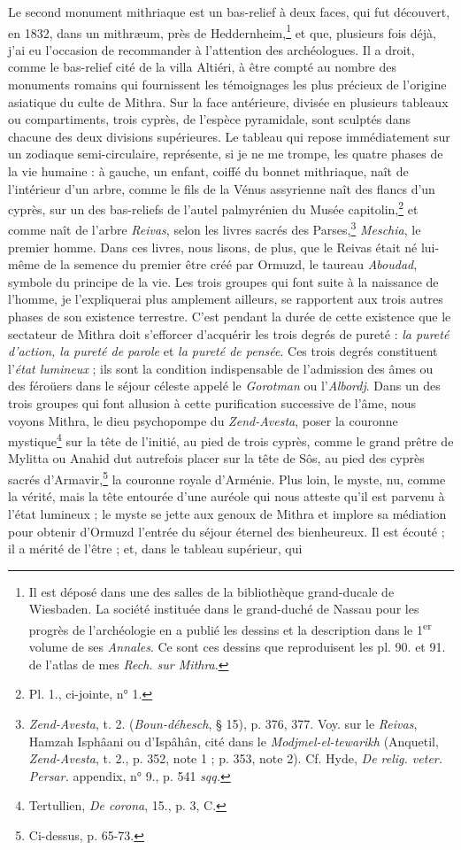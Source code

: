 \documentclass{article}
\begin{document}
Le second monument mithriaque est un bas-relief à deux faces, qui fut découvert, en 1832, dans un mithræum, près de Heddernheim,\footnote{Il est déposé dans une des salles de la bibliothèque grand-ducale de Wiesbaden. La société instituée dans le grand-duché de Nassau pour les progrès de l'archéologie en a publié les dessins et la description dans le 1\textsuperscript{er} volume de ses \emph{Annales}. Ce sont ces dessins que reproduisent les pl. 90. et 91. de l'atlas de mes \emph{Rech. sur Mithra}.} et que, plusieurs fois déjà, j'ai eu l'occasion de recommander à l'attention des archéologues. Il a droit, comme le bas-relief cité de la villa Altiéri, à être compté au nombre des monuments romains qui fournissent les témoignages les plus précieux de l'origine asiatique du culte de Mithra. Sur la face antérieure, divisée en plusieurs tableaux ou compartiments, trois cyprès, de l'espèce pyramidale, sont sculptés dans chacune des deux divisions supérieures. Le tableau qui repose immédiatement sur un zodiaque semi-circulaire, représente, si je ne me trompe, les quatre phases de la vie humaine : à gauche, un enfant, coiffé du bonnet mithriaque, naît de l'intérieur d'un arbre, comme le fils de la Vénus assyrienne naît des flancs d'un cyprès, sur un des bas-reliefs de l'autel palmyrénien du Musée capitolin,\footnote{Pl. 1., ci-jointe, n° 1.} et comme naît de l'arbre \emph{Reivas}, selon les livres sacrés des Parses,\footnote{\emph{Zend-Avesta}, t. 2. (\emph{Boun-déhesch}, § 15), p. 376, 377. Voy. sur le \emph{Reivas}, Hamzah Isphâani ou d'Ispâhân, cité dans le \emph{Modjmel-el-tewarikh} (Anquetil, \emph{Zend-Avesta}, t. 2., p. 352, note 1 ; p. 353, note 2). Cf. Hyde, \emph{De relig. veter. Persar.} appendix, n° 9., p. 541 \emph{sqq.}} \emph{Meschia}, le premier homme. Dans ces livres, nous lisons, de plus, que le Reivas était né lui-même de la semence du premier être créé par Ormuzd, le taureau \emph{Aboudad}, symbole du principe de la vie. Les trois groupes qui font suite à la naissance de l'homme, je l'expliquerai plus amplement ailleurs, se rapportent aux trois autres phases de son existence terrestre. C'est pendant la durée de cette existence que le sectateur de Mithra doit s'efforcer d'acquérir les trois degrés de pureté : \emph{la pureté d'action, la pureté de parole} et \emph{la pureté de pensée}. Ces trois degrés constituent l'\emph{état lumineux} ; ils sont la condition indispensable de l'admission des âmes ou des féroüers dans le séjour céleste appelé le \emph{Gorotman} ou l'\emph{Albordj}. Dans un des trois groupes qui font allusion à cette purification successive de l'âme, nous voyons Mithra, le dieu psychopompe du \emph{Zend-Avesta}, poser la couronne mystique\footnote{Tertullien, \emph{De corona}, 15., p. 3, C.} sur la tête de l'initié, au pied de trois cyprès, comme le grand prêtre de Mylitta ou Anahid dut autrefois placer sur la tête de Sôs, au pied des cyprès sacrés d'Armavir,\footnote{Ci-dessus, p. 65-73.} la couronne royale d'Arménie. Plus loin, le myste, nu, comme la vérité, mais la tête entourée d'une auréole qui nous atteste qu'il est parvenu à l'état lumineux ; le myste se jette aux genoux de Mithra et implore sa médiation pour obtenir d'Ormuzd l'entrée du séjour éternel des bienheureux. Il est écouté ; il a mérité de l'être ; et, dans le tableau supérieur, qui 
\end{document}

